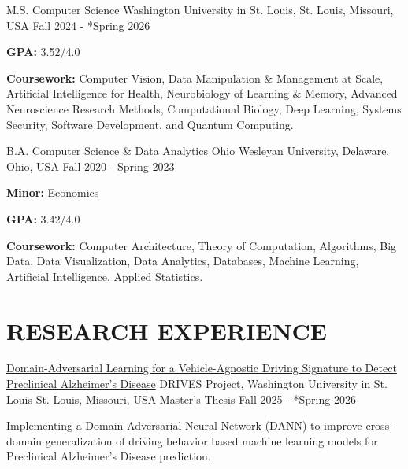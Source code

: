 \documentclass[10pt, letterpaper]{article}
\begin{document}
\begin{educationentry}
  {M.S. Computer Science} %
  {Washington University in St. Louis, St. Louis, Missouri, USA} %
  {Fall 2024 - *Spring 2026} %
  \item \textbf{GPA:} 3.52/4.0
  \item \textbf{Coursework:}  Computer Vision, Data Manipulation \& Management at Scale, Artificial Intelligence for Health, Neurobiology of Learning \& Memory, Advanced Neuroscience Research Methods, Computational Biology, Deep Learning, Systems Security, Software Development, and Quantum Computing.
\end{educationentry}

\begin{educationentry}
  {B.A. Computer Science \& Data Analytics} %
  {Ohio Wesleyan University, Delaware, Ohio, USA} %
  {Fall 2020 - Spring 2023} %
  \item \textbf{Minor:} Economics
  \item \textbf{GPA:} 3.42/4.0
  \item \textbf{Coursework:} Computer Architecture, Theory of Computation, Algorithms, Big Data, Data Visualization, Data Analytics, Databases, Machine Learning, Artificial Intelligence, Applied Statistics.
\end{educationentry}

\vspace{\headerSpacing}

\section{RESEARCH EXPERIENCE}

\begin{researchentry}
  {\href{}{Domain-Adversarial Learning for a Vehicle-Agnostic Driving Signature to Detect Preclinical Alzheimer's Disease}} %
  {DRIVES Project, Washington University in St. Louis} %
  {St. Louis, Missouri, USA} %
  {Master's Thesis} %
  {Fall 2025 - *Spring 2026} %
  \item Implementing a Domain Adversarial Neural Network (DANN) to improve cross-domain generalization of driving behavior based machine learning models for Preclinical Alzheimer's Disease prediction.
\end{researchentry}
\end{document}
